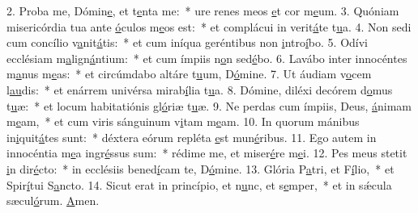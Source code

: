 2. Proba me, Dómin\uline{e}, et t\uline{e}nta me:~* ure renes meos \uline{e}t cor m\uline{e}um.
3. Quóniam misericórdia tua ante \uline{ó}culos m\uline{e}os est:~* et complácui in verit\uline{á}te t\uline{u}a.
4. Non sedi cum concílio v\uline{a}nit\uline{á}tis:~* et cum iníqua geréntibus non \uline{i}ntro\uline{í}bo.
5. Odívi ecclésiam m\uline{a}lign\uline{á}ntium:~* et cum ímpiis n\uline{o}n sed\uline{é}bo.
6. Lavábo inter innocéntes m\uline{a}nus m\uline{e}as:~* et circúmdabo altáre t\uline{u}um, D\uline{ó}mine.
7. Ut áudiam v\uline{o}cem l\uline{au}dis:~* et enárrem univérsa mirab\uline{í}lia t\uline{u}a.
8. Dómine, diléxi decórem d\uline{o}mus t\uline{u}æ:~* et locum habitatiónis gl\uline{ó}riæ t\uline{u}æ.
9. Ne perdas cum ímpiis, Deus, \uline{á}nimam m\uline{e}am,~* et cum viris sánguinum v\uline{i}tam m\uline{e}am.
10. In quorum mánibus in\uline{i}quit\uline{á}tes sunt:~* déxtera eórum repléta \uline{e}st mun\uline{é}ribus.
11. Ego autem in innocéntia m\uline{e}a ingr\uline{é}ssus sum:~* rédime me, et miser\uline{é}re m\uline{e}i.
12. Pes meus stetit \uline{i}n dir\uline{é}cto:~* in ecclésiis bened\uline{í}cam te, D\uline{ó}mine.
13. Glória P\uline{a}tri, et F\uline{í}lio,~* et Spir\uline{í}tui S\uline{a}ncto.
14. Sicut erat in princípio, et n\uline{u}nc, et s\uline{e}mper,~* et in sǽcula sæcul\uline{ó}rum. \uline{A}men.
